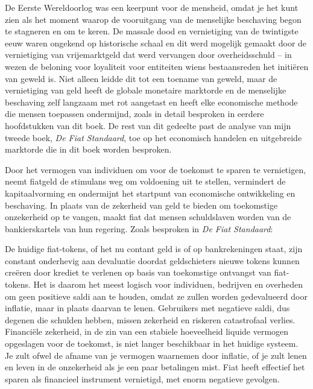 De Eerste Wereldoorlog was een keerpunt voor de mensheid, omdat je het kunt zien als het moment waarop de vooruitgang van de menselijke beschaving begon te stagneren en om te keren. De massale dood en vernietiging van de twintigste eeuw waren ongekend op historische schaal en dit werd mogelijk gemaakt door de vernietiging van vrijemarktgeld dat werd vervangen door overheidsschuld -- in wezen de beloning voor loyaliteit voor entiteiten wiens bestaansreden het initiëren van geweld is.\autocite{223} Niet alleen leidde dit tot een toename van geweld, maar de vernietiging van geld heeft de globale monetaire marktorde en de menselijke beschaving zelf langzaam met rot aangetast en heeft elke economische methode die mensen toepassen ondermijnd, zoals in detail besproken in eerdere hoofdstukken van dit boek. De rest van dit gedeelte past de analyse van mijn tweede boek, \emph{De Fiat Standaard}, toe op het economisch handelen en uitgebreide marktorde die in dit boek worden besproken.

Door het vermogen van individuen om voor de toekomst te sparen te vernietigen, neemt fiatgeld de stimulans weg om voldoening uit te stellen, vermindert de kapitaalvorming en ondermijnt het startpunt van economische ontwikkeling en beschaving. In plaats van de zekerheid van geld te bieden om toekomstige onzekerheid op te vangen, maakt fiat dat mensen schuldslaven worden van de bankierskartels van hun regering. Zoals besproken in \emph{De Fiat Standaard}:

\begin{blockquotebox}
    De huidige fiat-tokens, of het nu contant geld is of op bankrekeningen staat, zijn constant onderhevig aan devaluatie doordat geldschieters nieuwe tokens kunnen creëren door krediet te verlenen op basis van toekomstige ontvangst van fiat-tokens. Het is daarom het meest logisch voor individuen, bedrijven en overheden om geen positieve saldi aan te houden, omdat ze zullen worden gedevalueerd door inflatie, maar in plaats daarvan te lenen. Gebruikers met negatieve saldi, dus degenen die schulden hebben, missen zekerheid en riskeren catastrofaal verlies. Financiële zekerheid, in de zin van een stabiele hoeveelheid liquide vermogen opgeslagen voor de toekomst, is niet langer beschikbaar in het huidige systeem. Je zult ofwel de afname van je vermogen waarnemen door inflatie, of je zult lenen en leven in de onzekerheid als je een paar betalingen mist. Fiat heeft effectief het sparen als financieel instrument vernietigd, met enorm negatieve gevolgen.\footnotemark
\end{blockquotebox}

